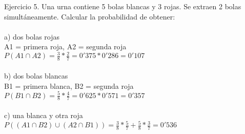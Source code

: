 
Ejercicio 5. Una urna contiene 5 bolas blancas y 3 rojas. Se extraen 2 bolas simultáneamente. Calcular la probabilidad de obtener: \\ \\
a) dos bolas rojas \\
A1 = primera roja, A2 = segunda roja \\
$P(A1 \cap A2) = \frac{3}{8} * \frac{2}{7} = 0'375*0'286 = 0'107$ \\ \\
b) dos bolas blancas \\ 
B1 = primera blanca, B2 = segunda roja \\
$P(B1 \cap B2) =  \frac{5}{8} * \frac{4}{7} = 0'625 * 0'571 = 0'357$ \\ \\
c) una blanca y otra roja \\
$P((A1 \cap B2)\cup (A2 \cap B1)) = \frac{3}{8}*\frac{5}{7} + \frac{5}{8}*\frac{3}{7} = 0'536$ \\